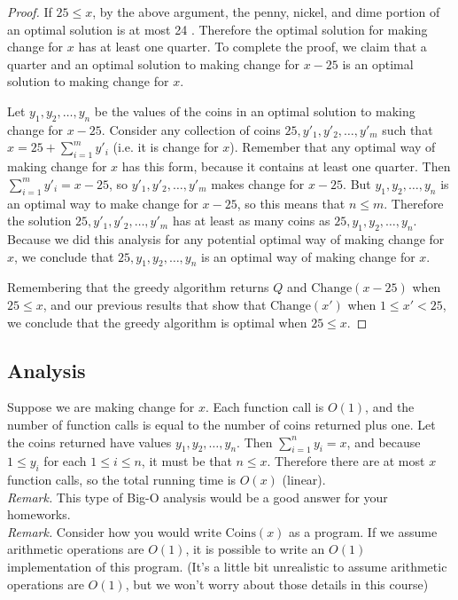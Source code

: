\documentclass[paper=a4, fontsize=11pt]{scrartcl} %
\numberwithin{equation}{section} %
\numberwithin{figure}{section} %
\numberwithin{table}{section} %
\begin{document}
\begin{proof}
If $25 \leq x$, by the above argument, the penny, nickel, and dime portion of an optimal solution is at most 24 \cent.
Therefore the optimal solution for making change for $x$ has at least one quarter.
To complete the proof, we claim that a quarter and an optimal solution to making change for $x - 25$ is an optimal solution to making change for $x$.

Let $y_1, y_2, \ldots, y_n$ be the values of the coins in an optimal solution to making change for $x - 25$.
Consider any collection of coins $25, y'_1, y'_2, \ldots, y'_m$ such that $x = 25 + \sum_{i=1}^m y'_i$ (i.e. it is change for $x$).
Remember that any optimal way of making change for $x$ has this form, because it contains at least one quarter.
Then $\sum_{i=1}^m y'_i = x - 25$, so $y'_1, y'_2, \ldots, y'_m$ makes change for $x - 25$.
But $y_1, y_2, \ldots, y_n$ is an optimal way to make change for $x - 25$, so this means that $n \leq m$.
Therefore the solution $25, y'_1, y'_2, \ldots, y'_m$ has at least as many coins as $25, y_1, y_2, \ldots, y_n$.
Because we did this analysis for any potential optimal way of making change for $x$, we conclude that $25, y_1, y_2, \ldots, y_n$ is an optimal way of making change for $x$.

Remembering that the greedy algorithm returns $Q$ and $\mathrm{Change}(x-25)$ when $25 \leq x$, and our previous results that show that $\mathrm{Change}(x')$ when $1 \leq x' < 25$, we conclude that the greedy algorithm is optimal when $25 \leq x$.
\end{proof}

\subsection{Analysis}
Suppose we are making change for $x$.
Each function call is $O(1)$, and the number of function calls is equal to the number of coins returned plus one.
Let the coins returned have values $y_1, y_2, \ldots, y_n$.
Then $\sum_{i=1}^n y_i = x$, and because $1 \leq y_i$ for each $1 \leq i \leq n$, it must be that $n \leq x$.
Therefore there are at most $x$ function calls, so the total running time is $O(x)$ (linear).\\

\textit{Remark.} This type of Big-O analysis would be a good answer for your homeworks.\\

\textit{Remark.} Consider how you would write $\mathrm{Coins}(x)$ as a program. If we assume arithmetic operations are $O(1)$, it is possible to write an $O(1)$ implementation of this program. (It's a little bit unrealistic to assume arithmetic operations are $O(1)$, but we won't worry about those details in this course)
\end{document}
